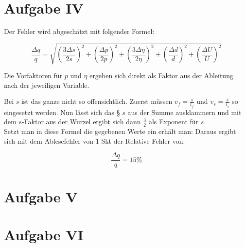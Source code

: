 \section{Aufgabe IV}
Der Fehler wird abgeschätzt mit folgender Formel:

\begin{equation}
    \frac{\Delta q}{q} = \sqrt{\left(\frac{3 \Delta s}{2s}\right)^2+\left(\frac{\Delta p}{2p}\right)^2+\left(\frac{3\Delta \eta}{2\eta}\right)^2+\left(\frac{\Delta d}{d}\right)^2+\left(\frac{\Delta U}{U}\right)^2}
\end{equation}

Die Vorfaktoren für $p$ und $\eta$ ergeben sich direkt als Faktor aus der Ableitung nach der jeweiligen Variable.

Bei $s$ ist das ganze nicht so offensichtlich. Zuerst müssen $v_f=\frac{s}{t_f}$ und $v_s=\frac{s}{t_s}$ so eingesetzt werden. Nun lässt sich das §
$s$ aus der Summe ausklammern und mit dem $s$-Faktor aus der Wurzel ergibt sich dann $\frac{3}{2}$ als Exponent für $s$. \\
Setzt man in diese Formel die gegebenen Werte ein erhält man:
Daraus ergibt sich mit dem Ablesefehler von 1 Skt der Relative Fehler von:

\[\frac{\Delta q}{q} = 15\%\]

\section{Aufgabe V}


\section{Aufgabe VI}
